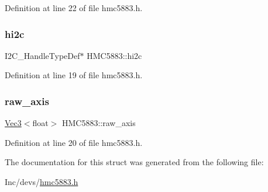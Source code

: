 Definition at line 22 of file hmc5883.\+h.

\mbox{\label{struct_h_m_c5883_a71d376bab0252d728f26b8d1be748438}} 
\subsubsection{\texorpdfstring{hi2c}{hi2c}}
{\footnotesize\ttfamily I2\+C\+\_\+\+Handle\+Type\+Def$\ast$ H\+M\+C5883\+::hi2c}



Definition at line 19 of file hmc5883.\+h.

\mbox{\label{struct_h_m_c5883_ad1333a78a3f2ef0f1387a8ccc802ba34}} 
\subsubsection{\texorpdfstring{raw\_axis}{raw\_axis}}
{\footnotesize\ttfamily \mbox{\hyperlink{class_vec3}{Vec3}}$<$float$>$ H\+M\+C5883\+::raw\+\_\+axis}



Definition at line 20 of file hmc5883.\+h.



The documentation for this struct was generated from the following file\+:\begin{DoxyCompactItemize}
\item 
Inc/devs/\mbox{\hyperlink{hmc5883_8h}{hmc5883.\+h}}\end{DoxyCompactItemize}
